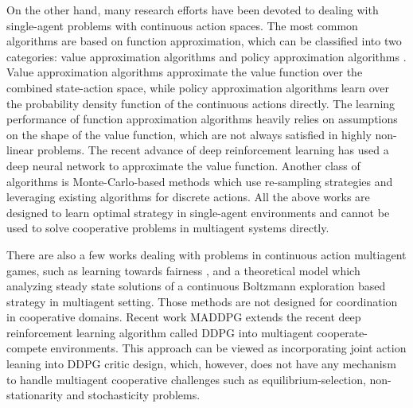 \documentclass[journal,transmag]{IEEEtran}
\begin{document}
On the other hand, many research efforts have been devoted to dealing with single-agent problems with continuous action spaces. The most common algorithms are based on function approximation, which can be classified into two categories: value approximation algorithms \cite{pazis2011Learning,Sutton2009FGM,Pazis2011Generalized,lillicrap2015continuous} and policy approximation algorithms \cite{Peters2008SIR,vanHasselt2012}. Value approximation algorithms approximate the value function over the combined state-action space, while policy approximation algorithms learn over the probability density function of the continuous actions directly. The learning performance of function approximation algorithms heavily relies on assumptions on the shape of the value function, which are not always satisfied in highly non-linear problems. The recent advance of deep reinforcement learning has \cite{Silver2014Deterministic,Mnih2013Playing,Mnih2015Human,lillicrap2015continuous,DBLP17} used a deep neural network to approximate the value function. Another class of algorithms is Monte-Carlo-based methods \cite{Sallans2004RLF,Lazaric2007Reinforcement} which use re-sampling strategies and leveraging existing algorithms for discrete actions. All the above works are designed to learn optimal strategy in single-agent environments and cannot be used to solve cooperative problems in multiagent systems directly.

There are also a few works dealing with problems in continuous action multiagent games, such as learning towards fairness \cite{deJong2008AAL}, and a theoretical model \cite{Galstyan2013CSR} which analyzing steady state solutions of a continuous Boltzmann exploration based strategy in multiagent setting. Those methods are not designed for coordination in cooperative domains. Recent work MADDPG \cite{NIPS2017_7217} extends the recent deep reinforcement learning algorithm called DDPG \cite{lillicrap2015continuous} into multiagent cooperate-compete environments. This approach can be viewed as incorporating joint action leaning into DDPG critic design, which, however, does not have any mechanism to handle multiagent cooperative challenges such as equilibrium-selection, non-stationarity and stochasticity problems.


\end{document}
